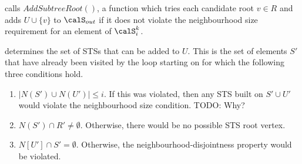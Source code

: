  calls $AddSubtreeRoot()$, a function which tries
each candidate root $v \in R$ and adds $U \cup \{v\}$ to $\calS_{out}$ if it
does not violate the neighbourhood size requirement for an element of
$\calS_i^k$.

 determines the set of STSs that can be added to $U$.
This is the set of elements $S'$ that have already been visited by the loop
starting on  for which the following three conditions hold.

\begin{enumerate}
  \item $|N(S') \cup N(U')| \leq i$.  If this was violated, then any STS built
     on $S' \cup U'$ would violate the neighbourhood size condition.  TODO: Why?
  \item $N(S') \cap R' \not= \emptyset$.  Otherwise, there would be no possible
     STS root vertex.
  \item $N[U'] \cap S' = \emptyset$.  Otherwise, the neighbourhood-disjointness
    property would be violated.
\end{enumerate}



